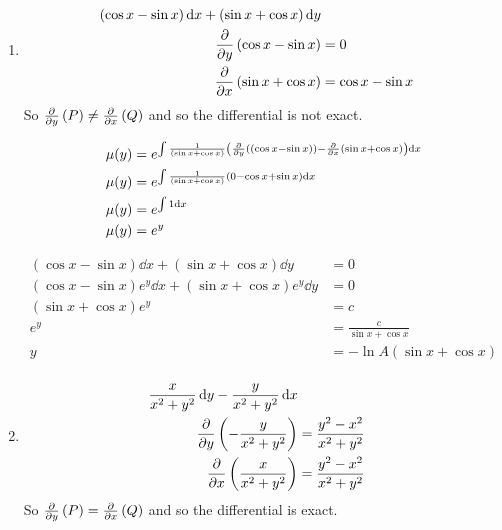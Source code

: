 \documentclass[10pt,\jkfside,a4paper]{article}
\begin{document}
\begin{enumerate}
\begin{enumerate}
\item 
\begin{equation}
\begin{split}
(\cos x - \sin x) \dd{x} + (\sin x + \cos x) \dd{y} \\
\pdv{y}\left(\cos x - \sin x \right) &= 0 \\
\pdv{x}\left(\sin x + \cos x \right) &= \cos x - \sin x \\
\end{split}
\end{equation}
So $\pdv{y}\left(P\right) \neq \pdv{x}\left(Q\right)$ and so the differential is not exact.

\begin{equation}
\begin{split}
\mu(y) &= e^{\int \frac{1}{(\sin x + \cos x)} \left(\pdv{y}\left((\cos x - \sin x)\right) - \pdv{x}\left( \sin x + \cos x \right) \right) \dd{x}} \\
\mu(y) &= e^{\int \frac{1}{(\sin x + \cos x)} \left(0 - \cos x + \sin x \right) \dd{x}} \\
\mu(y) &= e^{\int 1 \dd{x}} \\
\mu(y) &= e^y \\
\end{split}
\end{equation}

\begin{equation}
\begin{split}
(\cos x - \sin x) \dd{x} + (\sin x + \cos x) \dd{y} &= 0 \\
(\cos x - \sin x)e^y \dd{x} + (\sin x + \cos x)e^y \dd{y} &= 0 \\
(\sin x + \cos x)e^y &= c \\
e^y &= \frac{c}{\sin x + \cos x} \\
y &= -\ln A(\sin x + \cos x) \\
\end{split}
\end{equation}

\item 
\begin{equation}
\begin{split}
\frac{x}{x^2 + y^2} \dd{y} - \frac{y}{x^2 + y^2} \dd{x} \\
\pdv{y}\left(-\frac{y}{x^2 + y^2}\right) &= \frac{y^2 - x^2}{x^2 + y^2} \\
\pdv{x}\left(\frac{x}{x^2 + y^2}\right) &= \frac{y^2 - x^2}{x^2 + y^2} \\
\end{split}
\end{equation}
So $\pdv{y}\left(P\right) = \pdv{x}\left(Q\right)$ and so the differential is exact.


\end{enumerate}
\end{enumerate}
\end{document}

